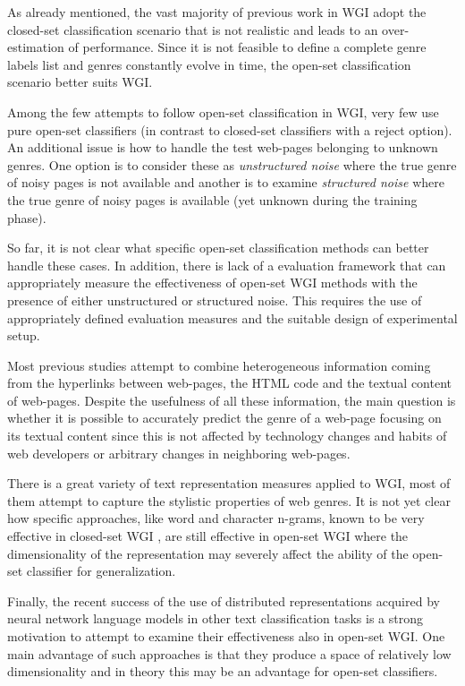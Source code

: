 As already mentioned, the vast majority of previous work in WGI adopt the closed-set classification scenario that is not realistic and leads to an over-estimation of performance. Since it is not feasible to define a complete genre labels list and genres constantly evolve in time, the open-set classification scenario better suits WGI. 

Among the few attempts to follow open-set classification in WGI, very few use pure open-set classifiers (in contrast to closed-set classifiers with a reject option). An additional issue is how to handle the test web-pages belonging to unknown genres. One option is to consider these as \textit{unstructured noise} where the true genre of noisy pages is not available and another is to examine \textit{structured noise} where the true genre of noisy pages is available (yet unknown during the training phase). 

So far, it is not clear what specific open-set classification methods can better handle these cases. In addition, there is lack of a evaluation framework that can appropriately measure the effectiveness of open-set WGI methods with the presence of either unstructured or structured noise. This requires the use of appropriately defined evaluation measures and the suitable design of experimental setup.

Most previous studies attempt to combine heterogeneous information coming from the hyperlinks between web-pages, the HTML code and the textual content of web-pages. Despite the usefulness of all these information, the main question is whether it is possible to accurately predict the genre of a web-page focusing on its textual content since this is not affected by technology changes and habits of web developers or arbitrary changes in neighboring web-pages. 

There is a great variety of text representation measures applied to WGI, most of them attempt to capture the stylistic properties of web genres. It is not yet clear how specific approaches, like word and character n-grams, known to be very effective in closed-set WGI \parencite{sharoff2010web}, are still effective in open-set WGI where the dimensionality of the representation may severely affect the ability of the open-set classifier for  generalization.

Finally, the recent success of the use of distributed representations acquired by neural network language models in other text classification tasks is a strong motivation to attempt to examine their effectiveness also in open-set WGI. One main advantage of such approaches is that they produce a space of relatively low dimensionality and in theory this may be an advantage for open-set classifiers.

